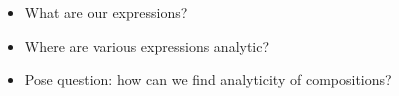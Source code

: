 
\begin{itemize}
  \item What are our expressions?
  \item Where are various expressions analytic?
  \item Pose question: how can we find analyticity of compositions?
\end{itemize}
